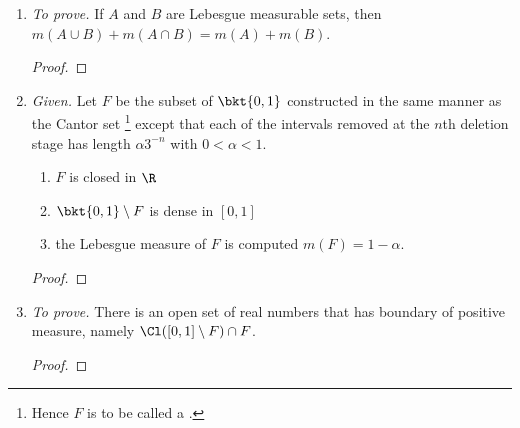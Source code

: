\documentclass[onesided]{ccg-pset}
\begin{document}
\begin{enumerate}
\begin{prop*}
    \label{prop:18}
    Suppose $\mu \colon \sM \to [0,\infty]$ is a complete Lebesgue-Stieltjes measure on $\R$ associated to an increasing, right continuous function $F$. If $E \subset \R$ has \emph{finite} measure with respect to $\mu$, then $E$ can be approximated by 
    \begin{enumerate}
        \item $E = V\setminus N_1$ where $V$ is a $G_\delta$ set and $\mu(N_1) = 0$, and
        \item $E = H \cup N_2$ where $H$ is an $F_\sigma$ set and $\mu(N_2) = 0$.
    \end{enumerate} 
\end{prop*}

\begin{proof}
    
\end{proof}

\setcounter{enumi}{23}
\item \emph{To prove.} If $A$ and $B$ are Lebesgue measurable sets, then $m(A \cup B) + m(A \cap B) = m(A) + m(B)$.
\begin{proof}

\end{proof}

\setcounter{enumi}{38}
\item  \emph{Given.} Let $F$ be the subset of $\bkt{0,1}$ constructed in the same manner as the Cantor set%
    \footnote{%
    Hence $F$ is to be called a .
    }
except that each of the intervals removed at the $n$th deletion stage has length $\alpha3^{-n}$ with $0 < \alpha < 1$. 
\begin{prop*}[]
    \label{prop:39}\hfill
    \begin{enumerate}
        \item $F$ is closed in $\R$
        \item $\bkt{0,1} \setminus F$ is dense in $[0,1]$
        \item the Lebesgue measure of $F$ is computed $m(F) = 1 - \alpha$.
    \end{enumerate}
\end{prop*}
\begin{proof}

\end{proof}

\item \emph{To prove.} There is an open set of real numbers that has boundary of positive measure, namely $\Cl([0,1] \setminus F) \cap F$.
\begin{proof}

\end{proof}
\end{enumerate}



\end{document}
